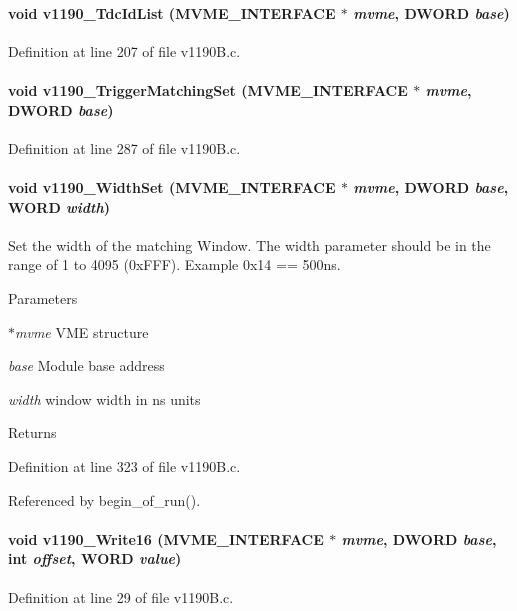\paragraph[{v1190\_\-TdcIdList}]{\setlength{\rightskip}{0pt plus 5cm}void v1190\_\-TdcIdList ({\bf MVME\_\-INTERFACE} $\ast$ {\em mvme}, \/  {\bf DWORD} {\em base})}\hfill\label{v1190B_8c_a5c6daf7dc9fa2cbce32423a6224ba4b9}


Definition at line 207 of file v1190B.c.
\paragraph[{v1190\_\-TriggerMatchingSet}]{\setlength{\rightskip}{0pt plus 5cm}void v1190\_\-TriggerMatchingSet ({\bf MVME\_\-INTERFACE} $\ast$ {\em mvme}, \/  {\bf DWORD} {\em base})}\hfill\label{v1190B_8c_a71a62eeb00aaef0cdc4868d87e21e0ac}


Definition at line 287 of file v1190B.c.
\paragraph[{v1190\_\-WidthSet}]{\setlength{\rightskip}{0pt plus 5cm}void v1190\_\-WidthSet ({\bf MVME\_\-INTERFACE} $\ast$ {\em mvme}, \/  {\bf DWORD} {\em base}, \/  {\bf WORD} {\em width})}\hfill\label{v1190B_8c_af9175bc6e8cd2dc1c63dbd69d974f8a1}
Set the width of the matching Window. The width parameter should be in the range of 1 to 4095 (0xFFF). Example 0x14 == 500ns. 
\begin{DoxyParams}{Parameters}
\item[{\em $\ast$mvme}]VME structure \item[{\em base}]Module base address \item[{\em width}]window width in ns units \end{DoxyParams}
\begin{DoxyReturn}{Returns}

\end{DoxyReturn}


Definition at line 323 of file v1190B.c.

Referenced by begin\_\-of\_\-run().
\paragraph[{v1190\_\-Write16}]{\setlength{\rightskip}{0pt plus 5cm}void v1190\_\-Write16 ({\bf MVME\_\-INTERFACE} $\ast$ {\em mvme}, \/  {\bf DWORD} {\em base}, \/  int {\em offset}, \/  {\bf WORD} {\em value})}\hfill\label{v1190B_8c_a19faae61239fb361fbc9b875368e6091}


Definition at line 29 of file v1190B.c.